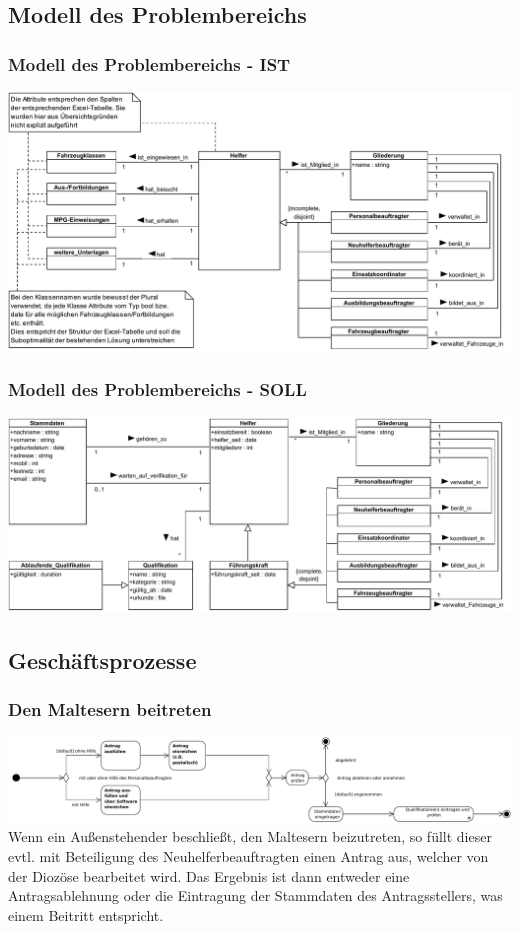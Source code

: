 \documentclass{beamer}
\begin{document}
\subsection{Modell des Problembereichs}		
\begin{frame}
\frametitle{Modell des Problembereichs - IST}
\includegraphics[width=\textwidth]{PDF/Klassendiagramm_ist.pdf}
\end{frame}
\begin{frame}
\frametitle{Modell des Problembereichs - SOLL}
\includegraphics[width=\textwidth]{PDF/Klassendiagramm_soll.pdf}
\end{frame}

\subsection{Geschäftsprozesse}		
\begin{frame}
\frametitle{Den Maltesern beitreten}
\includegraphics[width=\textwidth]{PDF/BusinessP/Mitglied_werden.pdf}
\pause
Wenn ein Außenstehender beschließt, den Maltesern beizutreten, so füllt dieser evtl. mit Beteiligung des Neuhelferbeauftragten einen Antrag aus, welcher von der Diozöse bearbeitet wird. Das Ergebnis ist dann entweder eine Antragsablehnung oder die Eintragung der Stammdaten des Antragsstellers, was einem Beitritt entspricht. 
\end{frame}
\end{document}
